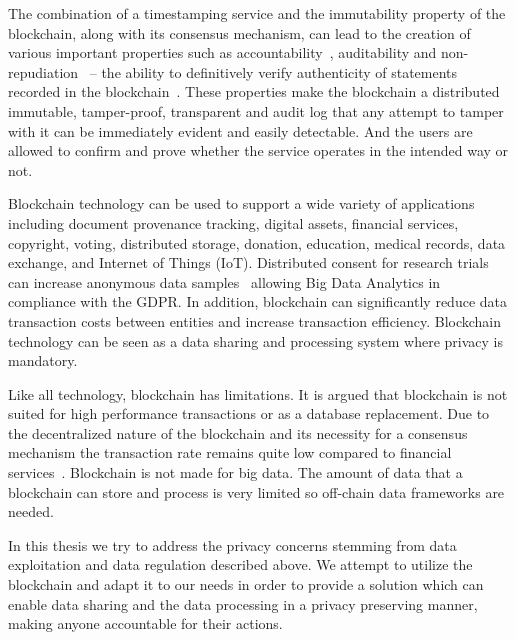 The combination of a timestamping service and the immutability property of the blockchain, along with its consensus mechanism, can lead to the creation of various important properties such as accountability~\cite{10.1007/978-3-540-46588-1_20}, auditability and non-repudiation~\cite{non_repudiation} -- the ability
to definitively verify authenticity of statements recorded in the blockchain~\cite{bl_auditability}. These properties make the blockchain a distributed immutable, tamper-proof, transparent and audit log that any attempt to tamper with it can be immediately evident and easily detectable. And the users are allowed to confirm and prove whether the service operates in the intended way or not.

Blockchain technology can be used to support a wide variety of applications including document provenance tracking, digital assets, financial services, copyright, voting, distributed storage, donation, education, medical records, data exchange, and Internet of Things (IoT). Distributed consent for research trials can increase anonymous data samples~\cite{ibm} allowing Big Data Analytics in compliance with the GDPR. In addition, blockchain can significantly reduce data transaction costs between entities and increase transaction efficiency. Blockchain technology can be seen as a data sharing and processing system where privacy is mandatory.

Like all technology, blockchain has limitations. It is argued that blockchain is not suited for high performance transactions or as a database replacement. Due to the decentralized nature of the blockchain and its necessity for a consensus mechanism the transaction rate remains quite low compared to financial services~\cite{Sompolinsky2015, Zohar:2015:BUH:2817191.2701411}. Blockchain is not made for big data. The amount of data that a blockchain can store and process is very limited so off-chain data frameworks are needed.

In this thesis we try to address the privacy concerns stemming from data exploitation and data regulation described above. We attempt to utilize the blockchain and adapt it to our needs in order to provide a solution which can enable data sharing and the data processing in a privacy preserving manner, making anyone accountable for their actions.
